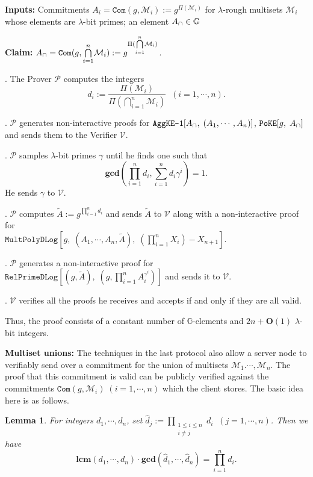 \documentclass[11pt, lettersize, notitlepage, leqno, footskip=0.6cm]{article}
\newcommand{\pl}{\prod\limits}
\newcommand{\slim}{\sum\limits}
\newcommand{\ttt}{\texttt}
\newcommand{\bG}{\mathbb{G}}
\newcommand{\pr}{\protect}
\newcommand{\wti}{\widetilde}
\newcommand{\mc}{\mathcal}
\newcommand{\mb}{\mathbb}
\newcommand{\mbf}{\mathbf}
\newcommand{\lam}{\lambda}
\newcommand{\what}{\widehat}
\newcommand{\bO}{\mbf{O}}
\newcommand{\mP}{\mc{P}}
\newcommand{\V}{\mc{V}}
\newcommand{\mcM}{\mc{M}}
\newcommand{\vs}{\vspace{-0.15cm}}
\newcommand{\noin}{\noindent}
\newcommand{\LCM}{\mbf{lcm}}
\newcommand{\GCD}{\mbf{gcd}}
\newtheorem{Lem}[Thm]{Lemma}
\numberwithin{equation}{section}
\begin{document}
\noin \textbf{Inputs:} Commitments $A_i = \ttt{Com}(g, \mcM_i) := g^{\Pi(\mc{M}_i)}$ for $\lam$-rough multisets $\mc{M}_i$ whose elements are $\lam$-bit primes; an element $A_{\tt{\cap}}\in\mb{G}$

\noin \textbf{Claim:} $A_{\tt{\cap}} = \protect{\verb|Com|}(g, {\bigcap\limits_{i=1}^n} \mc{M}_i) := g^{\Pi({\bigcap\limits_{i=1}^n} \mc{M}_i)}$.

\begin{prf1} \normalfont \noin 1. The Prover $\mP$ computes the integers \vs $$d_i:= \frac{\Pi(\mc{M}_i)}{\Pi({\bigcap\limits_{i=1}^n} \mc{M}_i)}\;\; (i=1,\cdots,n).$$

\noin 2. $\mP$ generates non-interactive proofs for $\pr{\ttt{AggKE-1}}[A_{\tt{\cap}},\;(A_1,\cdots,A_n)]$, $\ttt{PoKE}[g,\;A_{\tt{\cap}}]$ and sends them to the Verifier $\V$.

\noin 3. $\mP$ samples $\lam$-bit primes $\gamma$ until he finds one such that \vs $$ \GCD(\pl_{i=1}^n d_i, \slim_{i=1}^n d_i\gamma^i) = 1.$$ He sends $\gamma$ to $\V$.

\noin 4. $\mP$ computes $\wti{A}:= g^{\pl_{i=1}^n d_i}$ and sends $\wti{A}$ to $\V$ along with a non-interactive proof for\\ $\ttt{MultPolyDLog}[g,\; (A_1,\cdots,A_n, \wti{A}),\;(\pl_{i=1}^n X_i)-X_{n+1}]$.

\noin 5. $\mP$ generates a non-interactive proof for $\ttt{RelPrimeDLog}[(g, \wti{A}),\;(g, \pl_{i=1}^n A_i^{\gamma^i})]$ and sends it to $\V$.

\noin 6. $\V$ verifies all the proofs he receives and accepts if and only if they are all valid.\end{prf1}


\noin Thus, the proof consists of a constant number of $\bG$-elements and $2n+\bO(1)$ $\lam$-bit integers. 
 






\bigskip


\noin \textbf{Multiset unions:} The techniques in the last protocol also allow a server node to verifiably send over a commitment for the union of multisets $\mcM_1.\cdots,\mcM_n$. The proof that this commitment is valid can be publicly verified against the commitments $\ttt{Com}(g,\mc{M}_i)\;(i=1,\cdots,n)$ which the client stores. The basic idea here is as follows.

\begin{Lem} For integers $d_1,\cdots,d_n$, set $\what{d}_j:= \pl_{\substack{1\leq i\leq n \\ i\neq j}} d_i \;\;(j=1,\cdots,n)$. Then we have \vspace{-0.2cm} $$ \LCM(d_1,\cdots,d_n)\cdot \GCD(\what{d}_1,\cdots,\what{d}_n) = \pl_{i=1}^n d_i.$$ \end{Lem}
\end{document}
